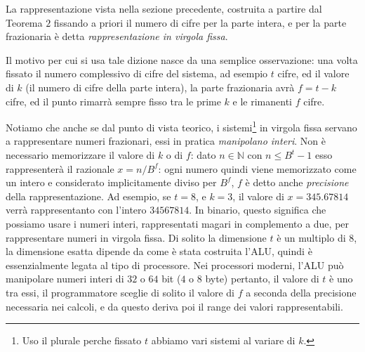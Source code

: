 La rappresentazione vista nella sezione precedente, costruita a partire dal Teorema $2$ fissando a priori il numero di cifre
per la parte intera, e per la parte frazionaria è detta \emph{rappresentazione in virgola fissa}. 

Il motivo per cui si usa tale dizione nasce da una semplice osservazione: una volta fissato il numero complessivo di cifre del sistema, ad esempio $t$ cifre, ed il valore di $k$ (il numero di cifre della parte intera), la parte frazionaria avrà $f = t-k$ cifre, ed il punto rimarrà
sempre fisso tra le prime $k$ e le rimanenti $f$ cifre. 

Notiamo che anche se dal punto di vista teorico, i sistemi\footnote{Uso il plurale perche fissato $t$ abbiamo vari sistemi al variare di $k$.} in virgola fissa servano a rappresentare numeri frazionari, essi in pratica \emph{manipolano interi}. Non è necessario memorizzare il valore di $k$ o di $f$: dato $n \in \mathbb{N}$ con $n \leq B^t-1$ esso rappresenterà il razionale $x = n / B^f$: ogni numero quindi viene memorizzato come un intero e considerato implicitamente diviso per $B^f$,  $f$ è detto anche \emph{precisione} della rappresentazione.
Ad esempio, se $t = 8$, e $k = 3$, il valore di $x = 345.67814$ verrà rappresentanto con l'intero $34567814$. In binario, questo significa che possiamo usare i numeri interi, rappresentati magari in complemento a due,
per rappresentare numeri in virgola fissa. Di solito la dimensione $t$ è
un multiplo di $8$, la dimensione esatta dipende da come è stata costruita l'ALU, quindi è essenzialmente legata al tipo di processore. Nei processori
moderni, l'ALU può manipolare numeri interi di $32$ o $64$ bit ($4$ o $8$ byte)
pertanto, il valore di $t$ è uno tra essi, il programmatore sceglie di solito il valore di $f$ a seconda della precisione necessaria nei calcoli, e da questo deriva poi il range dei valori rappresentabili. 

